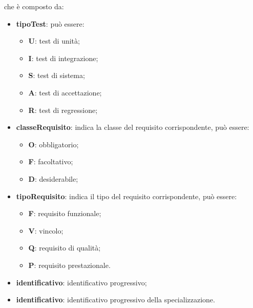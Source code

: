 	che è composto da:
	\begin{itemize}
	    \item \textbf{tipoTest}: può essere:
	    \begin{itemize}
	        \item \textbf{U}: test di unità;
	        \item \textbf{I}: test di integrazione;
	        \item \textbf{S}: test di sistema;
	        \item \textbf{A}: test di accettazione;
	        \item \textbf{R}: test di regressione;
	    \end{itemize}
	    \item \textbf{classeRequisito}: indica la classe del requisito corrispondente, può essere:
	        \begin{itemize}
	            \item \textbf{O}: obbligatorio;
	            \item \textbf{F}: facoltativo;
	            \item \textbf{D}: desiderabile;
	        \end{itemize}
	   \item \textbf{tipoRequisito}: indica il tipo del requisito corrispondente, può essere:
	        \begin{itemize}
	            \item \textbf{F}: requisito funzionale;
	            \item \textbf{V}: vincolo;
	            \item \textbf{Q}: requisito di qualità;
	            \item \textbf{P}: requisito prestazionale. 
	        \end{itemize}
	  \item \textbf{identificativo}: identificativo progressivo;
	  \item \textbf{identificativo}: identificativo progressivo della specializzazione.
	\end{itemize}
	
